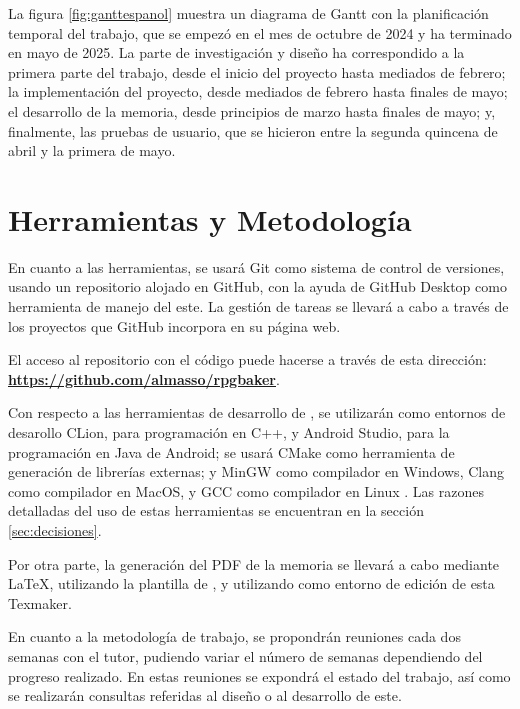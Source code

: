 La figura \ref{fig:ganttespanol} muestra un diagrama de Gantt con la planificación temporal del trabajo, que se empezó en el mes de octubre de 2024 y ha terminado en mayo de 2025. La parte de investigación y diseño ha correspondido a la primera parte del trabajo, desde el inicio del proyecto hasta mediados de febrero; la implementación del proyecto, desde mediados de febrero hasta finales de mayo; el desarrollo de la memoria, desde principios de marzo hasta finales de mayo; y, finalmente, las pruebas de usuario, que se hicieron entre la segunda quincena de abril y la primera de mayo.


\section{Herramientas y Metodología}
En cuanto a las herramientas, se usará Git como sistema de control de versiones, usando un repositorio alojado en GitHub, con la ayuda de GitHub Desktop como herramienta de manejo del este. La gestión de tareas se llevará a cabo a través de los proyectos que GitHub incorpora en su página web.

\smallskip

El acceso al repositorio con el código puede hacerse a través de esta dirección: \href{https://github.com/almasso/rpgbaker}{\textbf{https://github.com/almasso/rpgbaker}}.

\medskip

Con respecto a las herramientas de desarrollo de \baker, se utilizarán como entornos de desarollo CLion, para programación en C++, y Android Studio, para la programación en Java de Android; se usará CMake como herramienta de generación de librerías externas; y MinGW como compilador en Windows, Clang como compilador en MacOS, y GCC como compilador en Linux . Las razones detalladas del uso de estas herramientas se encuentran en la sección \ref{sec:decisiones}.

\medskip

Por otra parte, la generación del PDF de la memoria se llevará a cabo mediante \LaTeX , utilizando la plantilla de \texis , y utilizando como entorno de edición de esta Texmaker.

\bigskip

En cuanto a la metodología de trabajo, se propondrán reuniones cada dos semanas con el tutor, pudiendo variar el número de semanas dependiendo del progreso realizado. En estas reuniones se expondrá el estado del trabajo, así como se realizarán consultas referidas al diseño o al desarrollo de este.

